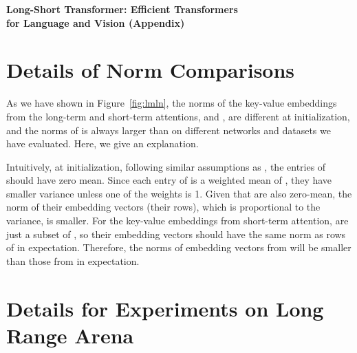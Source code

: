 

\begin{center}
    {\bf\Large Long-Short Transformer: Efficient Transformers \\ for Language and Vision (Appendix)}
\end{center}

\section{Details of Norm Comparisons}
\label{appendix:norm_analysis}
As we have shown in Figure~\ref{fig:lmln}, the norms of the key-value embeddings from the long-term and short-term attentions,  and , are different at initialization, and the norms of  is always larger than  on different networks and datasets we have evaluated. Here, we give an explanation.

Intuitively, at initialization, following similar assumptions as \citep{he2015delving,glorot2010understanding}, the entries of  should have zero mean. Since each entry of  is a weighted mean of , they have smaller variance unless one of the weights is 1. Given that  are also zero-mean, the norm of their embedding vectors (their rows), which is proportional to the variance, is smaller. 
For the key-value embeddings from short-term attention,  are just a subset of , so their embedding vectors should have the same norm as rows of  in expectation. Therefore, the norms of embedding vectors from  will be smaller than those from  in expectation.














\section{Details for Experiments on Long Range Arena}
\label{appendix:lra_configs}
